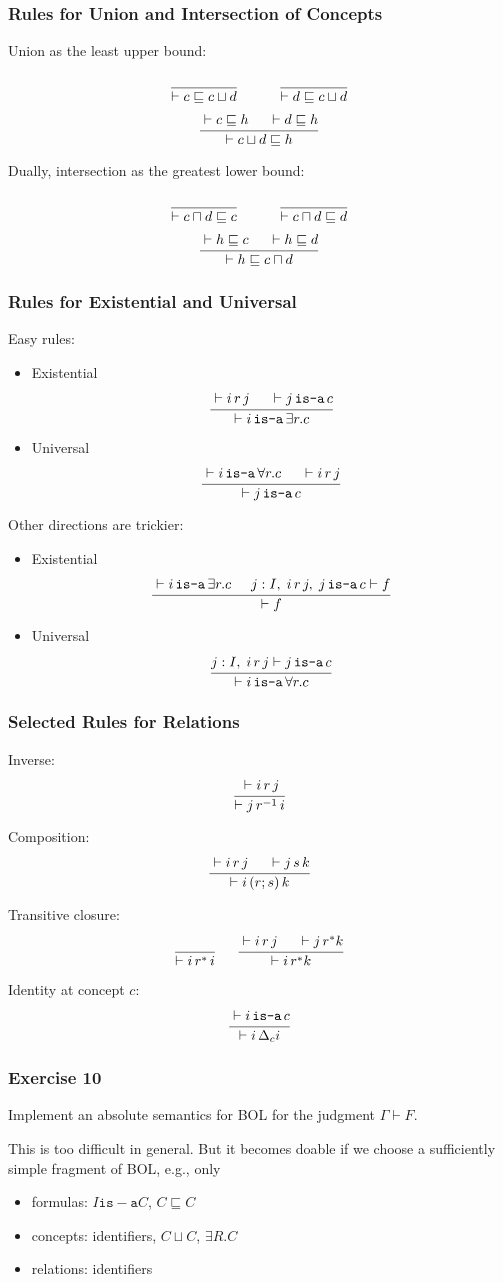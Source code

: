 \begin{frame}\frametitle{Rules for Union and Intersection of Concepts}
Union as the least upper bound:
\[\rul{}{\vdash c\sqsubseteq c\sqcup d} \tb\tb \rul{}{\vdash d\sqsubseteq c\sqcup d }\]
\[\cfrac{\vdash c\sqsubseteq h \hspace*{.5cm} \vdash d\sqsubseteq h}{\vdash c\sqcup d \sqsubseteq h}\,\]
\medskip

Dually, intersection as the greatest lower bound:
\[\rul{}{\vdash c\sqcap d\sqsubseteq c} \tb\tb \rul{}{\vdash c\sqcap d\sqsubseteq d}\]
\[\cfrac{\vdash h\sqsubseteq c \hspace*{.5cm} \vdash h\sqsubseteq d}{\vdash h \sqsubseteq c\sqcap d}\,\]
\end{frame}

\begin{frame}\frametitle{Rules for Existential and Universal}
Easy rules:
\begin{itemize}
\item Existential
\[\cfrac{\vdash i\,r\,j \hspace*{.5cm} \vdash j\mathop{\texttt{is-a}} c}{\vdash i \mathop{\texttt{is-a}} \exists r.c }\,\]
\item Universal
\[\cfrac{\vdash i \mathop{\texttt{is-a}} \forall r.c \hspace*{.5cm} \vdash i\,r\,j}{\vdash j\mathop{\texttt{is-a}} c}\,\]
\end{itemize}

Other directions are trickier:

\begin{itemize}
\item Existential
\[\cfrac{\vdash i \mathop{\texttt{is-a}} \exists r.c \hspace*{.5cm} j:I,\;i\,r\,j,\;j\mathop{\texttt{is-a}} c\vdash f}{\vdash f}\,\]
\item Universal
\[\cfrac{j:I,\; i\,r\,j\vdash j\mathop{\texttt{is-a}} c}{\vdash i\mathop{\texttt{is-a}}\forall r.c}\,\]
\end{itemize}
\end{frame}

\begin{frame}\frametitle{Selected Rules for Relations}
Inverse:
\[\cfrac{\vdash i \,r\,j}{\vdash j\,r^{-1}\,i}\,\]

Composition:
\[\cfrac{\vdash i \,r\,j \hspace*{.5cm} \vdash j\,s\,k}{\vdash i\,(r;s)\,k}\,\]

Transitive closure:
\[\cfrac{}{\vdash i \,r^*\,i}\, \hspace*{.5cm} \cfrac{\vdash i\,r\,j \hspace*{.5cm} \vdash j\,r^* k}{\vdash i\,r^* k}\,\]

Identity at concept $c$:
\[\cfrac{\vdash i \mathop{\texttt{is-a}} c}{\vdash i\,\Delta_c i}\,\]
\end{frame}

\begin{frame}\frametitle{Exercise 10}
Implement an absolute semantics for BOL for the judgment $\Gamma\vdash F$.

This is too difficult in general. But it becomes doable if we choose a sufficiently simple fragment of BOL, e.g., only
\begin{itemize}
\item formulas: $I\mathtt{is-a} C$, $C\sqsubseteq C$
\item concepts: identifiers, $C\sqcup C$, $\exists R.C$
\item relations: identifiers
\end{itemize}
\end{frame}

